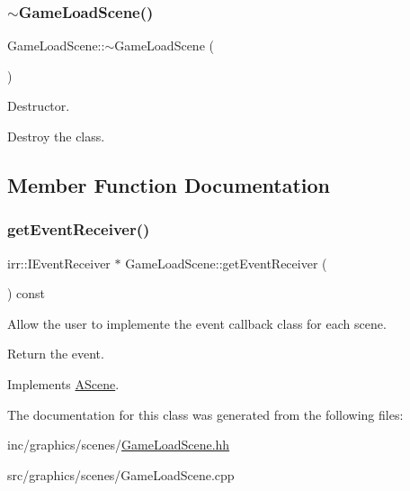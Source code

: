 \subsubsection{\texorpdfstring{$\sim$\+Game\+Load\+Scene()}{~GameLoadScene()}}
{\footnotesize\ttfamily Game\+Load\+Scene\+::$\sim$\+Game\+Load\+Scene (\begin{DoxyParamCaption}{ }\end{DoxyParamCaption})}



Destructor. 

Destroy the class. 

\subsection{Member Function Documentation}
\mbox{\label{classGameLoadScene_a81807790ad65bd2cf97a1e543cae2b74}} 
\subsubsection{\texorpdfstring{get\+Event\+Receiver()}{getEventReceiver()}}
{\footnotesize\ttfamily irr\+::\+I\+Event\+Receiver $\ast$ Game\+Load\+Scene\+::get\+Event\+Receiver (\begin{DoxyParamCaption}{ }\end{DoxyParamCaption}) const\hspace{0.3cm}{\ttfamily [virtual]}}



Allow the user to implemente the event callback class for each scene. 

Return the event. 

Implements \hyperlink{classAScene_af521e5e6d30a5d2e5d30eb333e4d3abd}{A\+Scene}.



The documentation for this class was generated from the following files\+:\begin{DoxyCompactItemize}
\item 
inc/graphics/scenes/\hyperlink{GameLoadScene_8hh}{Game\+Load\+Scene.\+hh}\item 
src/graphics/scenes/Game\+Load\+Scene.\+cpp\end{DoxyCompactItemize}
